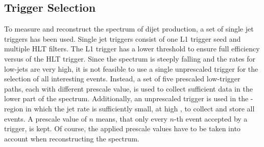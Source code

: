 \subsection{Trigger Selection}

To measure and reconstruct the \ptavg spectrum of dijet production, a set of
single jet triggers has been used. Single jet triggers consist of one L1 trigger
seed and multiple HLT filters. The L1 trigger has a lower threshold to ensure
full efficiency versus \pt of the HLT trigger. Since the \pt spectrum is steeply
falling and the rates for low-\pt jets are very high, it is not feasible to use
a single unprescaled trigger for the selection of all interesting events.
Instead, a set of five prescaled low-\pt trigger paths, each with different prescale
value, is used to collect sufficient data in the lower part of the \pt spectrum.
Additionally, an unprescaled trigger is used in the \pt-region in which the jet
rate is sufficiently small, \ie at high \pt, to collect and store all events. A prescale value of
$n$ means, that only every $n$-th event accepted by a trigger, is kept. Of course, the
applied prescale values have to be taken into account when reconstructing the
spectrum.

